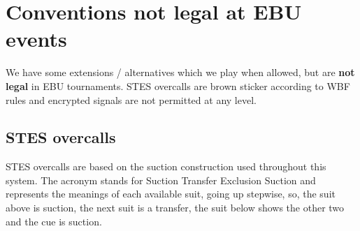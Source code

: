 \documentclass[a4paper,14pt]{extarticle}
\begin{document}
\newpage

\section{Conventions not legal at EBU events}
\label{sec:illegal}

We have some extensions / alternatives which we play when allowed, but are {\bf
not legal} in EBU tournaments. STES overcalls are brown sticker according to
WBF rules and encrypted signals are not permitted at any level.

\subsection{STES overcalls}
\label{sec:stes}

STES overcalls are based on the suction construction used throughout this
system.  The acronym stands for Suction Transfer Exclusion Suction and
represents the meanings of each available suit, going up stepwise, so, the suit
above is suction, the next suit is a transfer, the suit below shows the other
two and the cue is suction.
\end{document}
